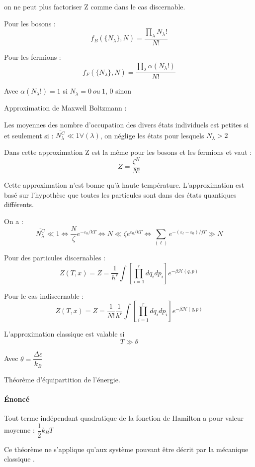 \documentclass[12pt,a4paper]{report}
\begin{document}
on ne peut plus factoriser Z comme dans le cas discernable.

Pour les bosons :
\[
	f_B(\lbrace N_\lambda \rbrace, N) = \dfrac{\prod_\lambda N_\lambda !}{N!}
\]

Pour les fermions :
\[
	f_F(\lbrace N_\lambda \rbrace, N) = \dfrac{\prod_\lambda \alpha (N_\lambda !)}{N!}
\]

Avec \( \alpha (N_\lambda !) =1 \) si $N_\lambda = 0~ou~1$, 0 sinon

Approximation de Maxwell Boltzmann :

Les moyennes des nombre d'occupation des divers états individuels est petites si et seulement si : $\overline{N^C_\lambda} \ll 1 \forall(\lambda)$, on néglige les états pour lesquels $N_\lambda > 2$

Dans cette approximation Z est la même pour les bosons et les fermions et vaut :
\[
	Z = \dfrac{\zeta^N}{N!}
\]

Cette approximation n'est bonne qu'à haute température.
L'approximation est basé sur l'hypothèse que toutes les particules sont dans des états quantiques différents.

On a :
\[
	\overline{N_\lambda^C} \ll 1 \Leftrightarrow \dfrac{N}{\zeta} e^{-\varepsilon_0/kT} \Leftrightarrow N \ll \zeta e^{\varepsilon_0/kT} \Leftrightarrow \sum_{(\ell)} e^{- (\varepsilon_\ell - \varepsilon_0)/jT} \gg N
\]

Pour des particules discernables :
\[
	Z(T,x) = Z = \dfrac{1}{h^r} \int \left[ \prod_{i=1}^r dq_i dp_i \right] e^{-\beta \mathcal{H}(q,p)}
\]

Pour le cas indiscernable :
\[
	Z(T,x) = Z = \dfrac{1}{N!} \dfrac{1}{h^r} \int \left[ \prod_{i=1}^r dq_i dp_i \right] e^{-\beta \mathcal{H}(q,p)}
\]

L'approximation classique est valable si 
\[
	T \gg \theta
\]

Avec $\theta = \dfrac{\Delta \varepsilon}{k_B}$

Théorème d'équipartition de l'énergie.

\paragraph{Énoncé}\quad

Tout terme indépendant quadratique de la fonction de Hamilton a pour valeur moyenne : \( \dfrac{1}{2} k_B T \)
	
Ce théorème ne s'applique qu'aux système pouvant être décrit par la mécanique classique	.
\end{document}
